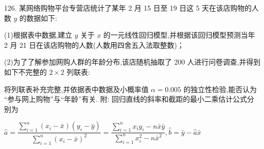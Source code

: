 \begin{center}
\end{center}

126. 某网络购物平台专营店统计了某年 2 月 15 日至 19 日这 5 天在该店购物的人数 $y$ 的数据如下:

\begin{center}
\end{center}

(1)根据表中数据,建立 $y$ 关于 $x$ 的一元线性回归模型,并根据该回归模型预测当年 2 月 21 日在该店购物的人数(人数用四舍五入法取整数)；

(2)为了了解参加网购人群的年龄分布,该店随机抽取了 200 人进行问卷调查,并得到如下不完整的 $2 \times  2$ 列联表:

\begin{center}
\end{center}

将列联表补充完整,并依据表中数据及小概率值 $\alpha  = {0.005}$ 的独立性检验,能否认为 “参与网上购物”与“年龄”有关. 附: 回归直线的斜率和截距的最小二乘估计公式分别为

$\widehat{a} = \dfrac{\mathop{\sum }\limits_{{i = 1}}^{n}\left( {{x}_{i} - \bar{x}}\right) \left( {{y}_{i} - \bar{y}}\right) }{\mathop{\sum }\limits_{{i = 1}}^{n}{\left( {x}_{i} - \bar{x}\right) }^{2}} = \dfrac{\mathop{\sum }\limits_{{i = 1}}^{n}{x}_{i}{y}_{i} - n\bar{x}\bar{y}}{\mathop{\sum }\limits_{{i = 1}}^{n}{x}_{i}^{2} - n{\bar{x}}^{2}},\widehat{b} = \bar{y} - \widehat{a}\bar{x}$

